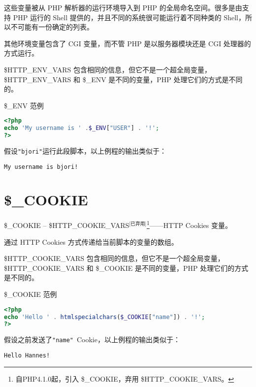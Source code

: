 这些变量被从 PHP 解析器的运行环境导入到 PHP 的全局命名空间。很多是由支持 PHP 运行的 Shell 提供的，并且不同的系统很可能运行着不同种类的 Shell，所以不可能有一份确定的列表。

其他环境变量包含了 CGI 变量，而不管 PHP 是以服务器模块还是 CGI 处理器的方式运行。

\$HTTP\_ENV\_VARS 包含相同的信息，但它不是一个超全局变量，\$HTTP\_ENV\_VARS 和 \$\_ENV 是不同的变量，PHP 处理它们的方式是不同的。





\begin{example}
\$\_ENV 范例
\begin{lstlisting}[language=PHP]
<?php
echo 'My username is ' .$_ENV["USER"] . '!';
?>
\end{lstlisting}
\end{example}

假设\texttt{"bjori"}运行此段脚本，以上例程的输出类似于：

\begin{verbatim}
My username is bjori!
\end{verbatim}




\section{\$\_COOKIE}

\$\_COOKIE -- \$HTTP\_COOKIE\_VARS$^{\text{[已弃用]}}$\footnote{自PHP4.1.0起，引入 \$\_COOKIE，弃用 \$HTTP\_COOKIE\_VARS。}——HTTP Cookies 变量。



通过 HTTP Cookies 方式传递给当前脚本的变量的数组。

\$HTTP\_COOKIE\_VARS 包含相同的信息，但它不是一个超全局变量，\$HTTP\_COOKIE\_VARS 和 \$\_COOKIE 是不同的变量，PHP 处理它们的方式是不同的。




\begin{example}
\$\_COOKIE 范例
\begin{lstlisting}[language=PHP]
<?php
echo 'Hello ' . htmlspecialchars($_COOKIE["name"]) . '!';
?>
\end{lstlisting}
\end{example}

假设之前发送了\texttt{"name"}~Cookie，以上例程的输出类似于：

\begin{verbatim}
Hello Hannes!
\end{verbatim}


